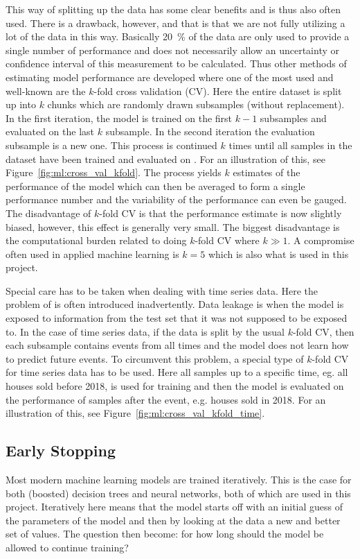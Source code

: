 This way of splitting up the data has some clear benefits and is thus also often used. There is a drawback, however, and that is that we are not fully utilizing a lot of the data in this way. Basically \SI{20}{\percent} of the data are only used to provide a single number of performance and does not necessarily allow an uncertainty or confidence interval of this measurement to be calculated. Thus other methods of estimating model performance are developed where one of the most used and well-known are the $k$-fold cross validation (CV). Here the entire dataset is split up into $k$ chunks which are randomly drawn subsamples (without replacement). In the first iteration, the model is trained on the first $k-1$ subsamples and evaluated on the last $k$ subsample. In the second iteration the evaluation subsample is a new one. This process is continued $k$ times until all samples in the dataset have been trained and evaluated on \citep{hastieElementsStatisticalLearning2009}. For an illustration of this, see Figure~\ref{fig:ml:cross_val_kfold}. The process yields $k$ estimates of the performance of the model which can then be averaged to form a single performance number and the variability of the performance can even be gauged. The disadvantage of $k$-fold CV is that the performance estimate is now slightly biased, however, this effect is generally very small. The biggest disadvantage is the computational burden related to doing $k$-fold CV where $k\gg 1$. A compromise often used in applied machine learning is $k=5$ which is also what is used in this project.  

Special care has to be taken when dealing with time series data. Here the problem of  is often introduced inadvertently. Data leakage is when the model is exposed to information from the test set that it was not supposed to be exposed to. In the case of time series data, if the data is split by the usual $k$-fold CV, then each subsample contains events from all times and the model does not learn how to predict future events. To circumvent this problem, a special type of $k$-fold CV for time series data has to be used. Here all samples up to a specific time, eg. all houses sold before 2018, is used for training and then the model is evaluated on the performance of samples after the event, e.g. houses sold in \num{2018}. For an illustration of this, see Figure~\ref{fig:ml:cross_val_kfold_time}.


\subsection{Early Stopping}
\label{subsec:early_stopping}
Most modern machine learning models are trained iteratively. This is the case for both (boosted) decision trees and neural networks, both of which are used in this project. Iteratively here means that the model starts off with an initial guess of the parameters of the model and then by looking at the data  a new and better set of values. The question then become: for how long should the model be allowed to continue training?

